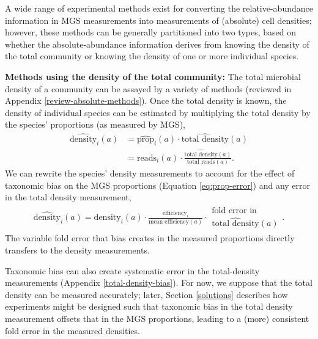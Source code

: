 \documentclass[
]{article}
\begin{document}
A wide range of experimental methods exist for converting the relative-abundance information in MGS measurements into measurements of (absolute) cell densities;
however, these methods can be generally partitioned into two types, based on whether the absolute-abundance information derives from knowing the density of the total community or knowing the density of one or more individual species.

\textbf{Methods using the density of the total community:}
The total microbial density of a community can be assayed by a variety of methods (reviewed in Appendix \ref{review-absolute-methods}).
Once the total density is known, the density of individual species can be estimated by multiplying the total density by the species' proportions (as measured by MGS),
\begin{align}
  \label{eq:density-prop-meas}
  \widehat{\text{density}}_{i}(a) 
  &= \widehat{\text{prop}}_{i}(a) \cdot \widehat{\text{total density}}(a)
\\&= \text{reads}_{i}(a) \cdot \frac{\widehat{\text{total density}}(a)}{\text{total reads}(a)}.
\end{align}
We can rewrite the species' density measurements to account for the effect of taxonomic bias on the MGS proportions (Equation \eqref{eq:prop-error}) and any error in the total density measurement,
\begin{align}
  \label{eq:density-prop-error}
  \widehat{\text{density}}_{i}(a) 
  = \text{density}_{i}(a) \cdot \frac{\text{efficiency}_{i}}{\text{mean efficiency}(a)} 
  \cdot \begin{array}{c} \text{fold error in} \\ \widehat{\text{total density}}(a) \end{array}.
\end{align}
The variable fold error that bias creates in the measured proportions directly transfers to the density measurements.

Taxonomic bias can also create systematic error in the total-density measurements (Appendix \ref{total-density-bias}).
For now, we suppose that the total density can be measured accurately;
later, Section \ref{solutions} describes how experiments might be designed such that taxonomic bias in the total density measurement offsets that in the MGS proportions, leading to a (more) consistent fold error in the measured densities.
\end{document}
